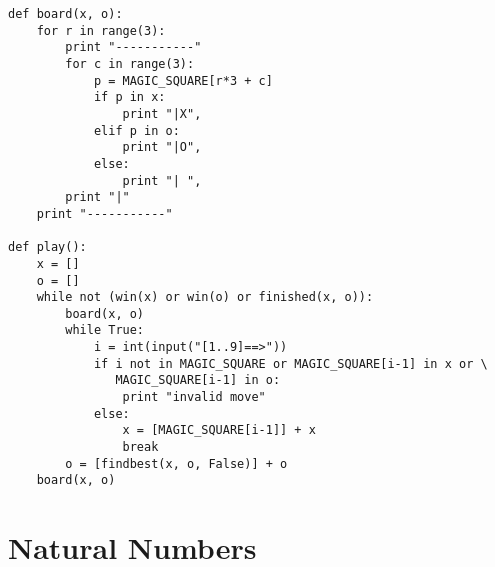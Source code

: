 \documentclass[UTF8]{article}
\begin{document}
\begin{enumerate}
\begin{lstlisting}
def board(x, o):
    for r in range(3):
        print "-----------"
        for c in range(3):
            p = MAGIC_SQUARE[r*3 + c]
            if p in x:
                print "|X",
            elif p in o:
                print "|O",
            else:
                print "| ",
        print "|"
    print "-----------"

def play():
    x = []
    o = []
    while not (win(x) or win(o) or finished(x, o)):
        board(x, o)
        while True:
            i = int(input("[1..9]==>"))
            if i not in MAGIC_SQUARE or MAGIC_SQUARE[i-1] in x or \
               MAGIC_SQUARE[i-1] in o:
                print "invalid move"
            else:
                x = [MAGIC_SQUARE[i-1]] + x
                break
        o = [findbest(x, o, False)] + o
    board(x, o)
\end{lstlisting}

\end{enumerate}

\section{Natural Numbers}
\end{document}
